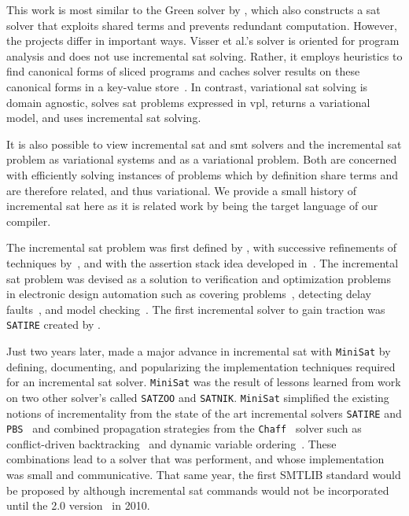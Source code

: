 \label{section:related-work:similar-solvers}
%
This work is most similar to the Green solver by \citet{VGD:FSE12}, which also
constructs a \ac{sat} solver that exploits shared terms and prevents redundant
computation. However, the projects differ in important ways. Visser et al.'s
solver is oriented for program analysis and does not use incremental \ac{sat}
solving. Rather, it employs heuristics to find canonical forms of sliced
programs and caches solver results on these canonical forms in a key-value
store~\citep{redis}. In contrast, variational \ac{sat} solving is domain
agnostic, solves \ac{sat} problems expressed in \ac{vpl}, returns a variational
model, and uses incremental \ac{sat} solving.

It is also possible to view incremental \ac{sat} and \ac{smt} solvers and the
incremental \ac{sat} problem as variational systems and as a variational
problem. Both are concerned with efficiently solving instances of problems which
by definition share terms and are therefore related, and thus variational. We
provide a small history of incremental \ac{sat} here as it is related work by
being the target language of our compiler.

The incremental \ac{sat} problem was first defined by \citet{hooker_1993}, with
successive refinements of techniques by~\citet{branch-bound}, and with the
assertion stack idea developed in~\citet{kim2000solving}. The incremental
\ac{sat} problem was devised as a solution to verification and optimization
problems in electronic design automation such as covering
problems~\cite{10.1145/217474.217603}, detecting delay
faults~\cite{10.1145/343647.343801}, and model
checking~\cite{Clarke:1986:AVF:5397.5399}. The first incremental solver to gain
traction was \texttt{SATIRE} created by \citet{10.1145/378239.379019}.

Just two years later, \citet{10.1007/978-3-540-24605-3_37} made a major advance
in incremental \ac{sat} with \texttt{MiniSat} by defining, documenting, and
popularizing the implementation techniques required for an incremental \ac{sat}
solver. \texttt{MiniSat} was the result of lessons learned from work on two
other solver's called \texttt{SATZOO} and \texttt{SATNIK}. \texttt{MiniSat}
simplified the existing notions of incrementality from the state of the art
incremental solvers \texttt{SATIRE} and
\texttt{PBS}~\cite{10.1145/774572.774638} and combined propagation strategies
from the \texttt{Chaff}~\cite{Moskewicz:2001:CEE:378239.379017} solver such as
conflict-driven backtracking~\cite{Zhang:2001:ECD:603095.603153} and dynamic
variable ordering~\cite{Moskewicz:2001:CEE:378239.379017}. These combinations
lead to a solver that was performent, and whose implementation was small and
communicative. That same year, the first SMTLIB standard would be proposed by
\citet{SMT-LIBformat} although incremental \ac{sat} commands would not be
incorporated until the 2.0 version~\cite{BarST-RR-10} in 2010.

